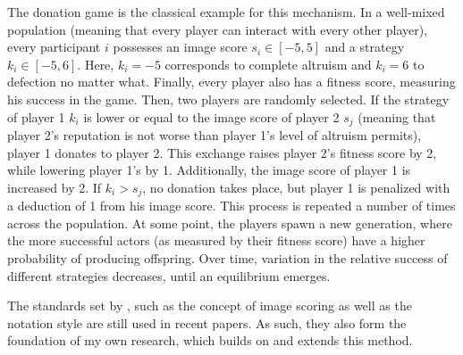 \documentclass[12pt]{article}
\begin{document}
The donation game is the classical example for this mechanism. In a well-mixed population (meaning that every player can interact with every other player), every participant $i$ possesses an image score $s_i \in [-5,5]$ and a strategy $k_i \in [-5,6]$. Here, $k_i=-5$ corresponds to complete altruism and $k_i=6$ to defection no matter what. Finally, every player also has a fitness score, measuring his success in the game. Then, two players are randomly selected. If the strategy of player 1 $k_i$ is lower or equal to the image score of player 2 $s_j$ (meaning that player 2's reputation is not worse than player 1's level of altruism permits), player 1 donates to player 2. This exchange raises player 2's fitness score by 2, while lowering player 1's by 1. Additionally, the image score of player 1 is increased by 2. If $k_i>s_j$, no donation takes place, but player 1 is penalized with a deduction of 1 from his image score. This process is repeated a number of times across the population. At some point, the players spawn a new generation, where the more successful actors (as measured by their fitness score) have a higher probability of producing offspring. Over time, variation in the relative success of different strategies decreases, until an equilibrium emerges.

The standards set by \cite{Nowak1998}, such as the concept of image scoring as well as the notation style are still used in recent papers. As such, they also form the foundation of my own research, which builds on and extends this method.
\end{document}
